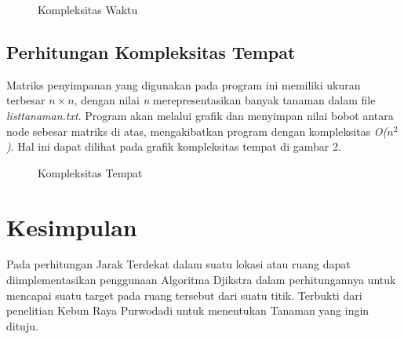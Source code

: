 \documentclass[conference]{IEEEtran}
\begin{document}
\begin{figure}[htbp]
	\centering
	\scalebox{0.22}{}
	\caption{Kompleksitas Waktu}
\end{figure} 

\subsection{Perhitungan Kompleksitas Tempat}
Matriks penyimpanan yang digunakan pada program ini memiliki ukuran terbesar $n \times n$, dengan nilai \textit{n} merepresentasikan banyak tanaman dalam ﬁle \textit{listtanaman.txt}. Program akan melalui graﬁk dan menyimpan nilai bobot antara node sebesar matriks di atas, mengakibatkan program dengan kompleksitas \textit{O($n^2$)}. Hal ini dapat dilihat pada graﬁk kompleksitas tempat di gambar 2.
\begin{figure}[htbp]
	\centering
	\scalebox{0.22}{}
	\caption{Kompleksitas Tempat}
\end{figure}

\section{Kesimpulan}
Pada perhitungan Jarak Terdekat dalam suatu lokasi atau ruang dapat diimplementasikan penggunaan Algoritma Djikstra dalam perhitungannya untuk mencapai suatu target pada ruang tersebut dari suatu titik. Terbukti dari penelitian Kebun Raya Purwodadi untuk menentukan Tanaman yang ingin dituju.



\end{document}
